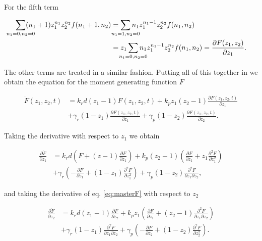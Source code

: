 For the fifth term

\begin{equation}
\label{eq:mom4}
\begin{split}
\sum_{\mathclap{n_1=0,n_2=0}}(n_1+1)z_1^{n_1}z_2^{n_2}f(n_1+1,n_2) &= \sum_{\mathclap{n_1=1,n_2=0}}n_1z_1^{n_1-1}z_2^{n_2}f(n_1,n_2)\\ 
&= z_1 \sum_{\mathclap{n_1=0,n_2=0}}n_1z_1^{n_1-1}z_2^{n_2}f(n_1,n_2) = \frac{\partial F(z_1,z_2)}{\partial z_1}.
\end{split}
\end{equation}

The other terms are treated in a similar fashion. Putting all of this together in we obtain the equation for the moment generating function $F$

\begin{equation}
\label{eq:masterF}
\begin{split}
\dot{F}(z_1,z_2,t) &= k_rd(z_1-1)F(z_1,z_2,t) + k_pz_1(z_2-1)\frac{\partial F(z_1,z_2,t)}{\partial z_1} \\
&+ \gamma_r(1-z_1)\frac{\partial F(z_1,z_2,t)}{\partial z_1} + \gamma_p(1-z_2)\frac{\partial F(z_1,z_2,t)}{\partial z_2}.
\end{split}
\end{equation}

Taking the derivative with respect to $z_1$ we obtain

\begin{equation}
\label{eq:dz1}
\begin{split}
\frac{\partial \dot{F}}{\partial z_1} &= k_rd\left( F+(z-1)\frac{\partial F}{\partial z_1} \right) + k_p(z_2-1) \left( \frac{\partial F}{\partial z_1} + z_1 \frac{\partial^2 F}{\partial z_1^2} \right)\\
&+\gamma_r\left(-\frac{\partial F}{\partial z_1}+(1-z_1)\frac{\partial^2 F}{\partial z_1^2}\right)+\gamma_p(1-z_2)\frac{\partial^2 F}{\partial z_1 \partial z_2},
\end{split}
\end{equation}

and taking the derivative of eq. \ref{eq:masterF} with respect to $z_2$

\begin{equation}
\label{eq:dz2}
\begin{split}
\frac{\partial \dot{F}}{\partial z_2}&=k_rd(z_1-1)\frac{\partial F}{\partial z_2} + k_pz_1\left(\frac{\partial F}{\partial z_1} + (z_2-1)\frac{\partial^2 F}{\partial z_1 \partial z_2} \right)\\
&+ \gamma_r(1-z_1)\frac{\partial^2 F}{\partial z_1 \partial z_2} + \gamma_p\left(-\frac{\partial F}{\partial z_2}+(1-z_2)\frac{\partial^2 F}{\partial z_2^2}\right).
\end{split}
\end{equation}

